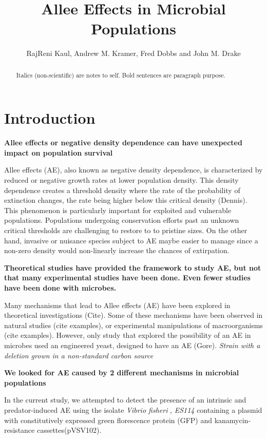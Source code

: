 \documentclass[a4paper,10pt]{article}
\title{Allee Effects in Microbial Populations}
\author{RajReni Kaul, Andrew M. Kramer, Fred Dobbs and John M. Drake}
\begin{document}


\maketitle

\begin{abstract}
Italics (non-scientific) are notes to self. Bold sentences are paragraph purpose. 
\end{abstract}

\section{Introduction}

\textbf{Allee effects or negative density dependence can have unexpected impact on population survival}

Allee effects (AE), also known as negative density dependence, is characterized by reduced or negative growth rates at lower population density. This density dependence creates a threshold density where the rate of the probability of extinction changes, the rate being higher below this critical density (Dennis). This phenomenon is particularly important for exploited and vulnerable populations. Populations undergoing conservation efforts past an unknown critical thresholds are challenging to restore to to pristine sizes. On the other hand, invasive or nuisance species subject to AE maybe easier to manage since a non-zero density would non-linearly increase the chances of extirpation. 

\textbf{Theoretical studies have provided the framework to study AE, but not that many experimental studies have been done. Even fewer studies have been done with microbes. }

Many mechanisms that lead to Allee effects (AE) have been explored in theoretical investigations (Cite). Some of these mechanisms have been observed in natural studies (cite examples), or experimental manipulations of macroorganisms (cite examples). However, only study that explored the possibility of an AE in microbes used an engineered yeast, designed to have an AE (Gore). \textit{Strain with a deletion grown in a non-standard carbon source} 

\textbf{We looked for AE caused by 2 different mechanisms in microbial populations }

In the current study,  we attempted to detect the presence of an intrinsic and predator-induced AE using the isolate \textit{Vibrio fisheri} , \textit{ES114} containing a plasmid with constitutively expressed green florescence protein (GFP) and kanamycin-resistance cassettes(pVSV102).  
\end{document}
